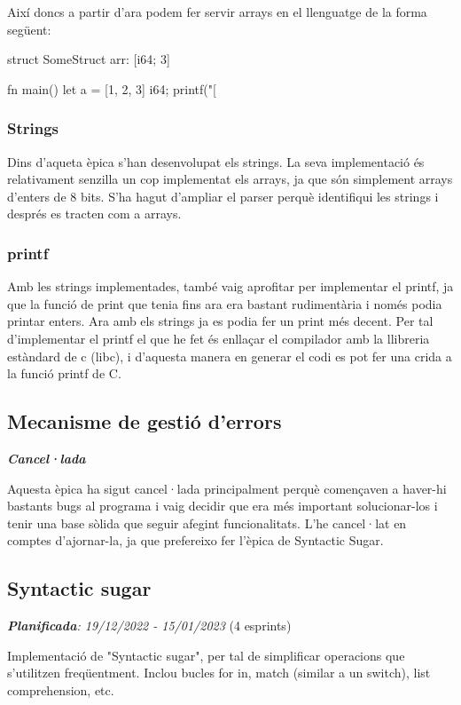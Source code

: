 ﻿\documentclass{article}
\begin{document}
Així doncs a partir d'ara podem fer servir arrays en el llenguatge de la forma
següent:

\begin{code}
struct SomeStruct {
    arr: [i64; 3]
}

fn main() {
    let a = [1, 2, 3] i64;
    printf("[%
}
\end{code}

\subsubsection{Strings}
Dins d'aqueta èpica s'han desenvolupat els strings. La seva implementació és
relativament senzilla un cop implementat els arrays, ja que són simplement arrays
d'enters de 8 bits. S'ha hagut d'ampliar el parser perquè identifiqui les
strings i després es tracten com a arrays.

\subsubsection{printf}
Amb les strings implementades, també vaig aprofitar per implementar el printf,
ja que la funció de print que tenia fins ara era bastant rudimentària i només
podia printar enters. Ara amb els strings ja es podia fer un print més decent.
Per tal d'implementar el printf el que he fet és enllaçar el compilador amb la
llibreria estàndard de c (libc), i d'aquesta manera en generar el codi es pot
fer una crida a la funció printf de C.

\subsection{Mecanisme de gestió d'errors}
\textit{\textbf{Cancel·lada}}

Aquesta èpica ha sigut cancel·lada principalment perquè començaven a haver-hi 
bastants bugs al programa i vaig decidir que era més important solucionar-los
i tenir una base sòlida que seguir afegint funcionalitats. L'he cancel·lat en 
comptes d'ajornar-la, ja que prefereixo fer l'èpica de Syntactic Sugar.

\subsection{Syntactic sugar}
\textit{\textbf{Planificada}: 19/12/2022 - 15/01/2023} (4 esprints)

Implementació de "Syntactic sugar", per tal de simplificar operacions que
s'utilitzen freqüentment. Inclou bucles for in, match (similar a un switch),
list comprehension, etc.
\end{document}

